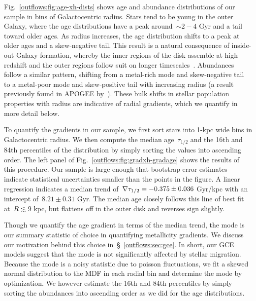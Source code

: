Fig.~\ref{outflows:fig:age-xh-dists} shows age and abundance distributions of
our sample in bins of Galactocentric radius.
Stars tend to be young in the outer Galaxy, where the age distributions have a
peak around~$\sim$$2-4$ Gyr and a tail toward older ages.
As radius increases, the age distribution shifts to a peak at older ages and a
skew-negative tail.
This result is a natural consequence of inside-out Galaxy formation, whereby
the inner regions of the disk assemble at high redshift and the outer regions
follow suit on longer timescales~\citep[e.g.,][]{White1991, Bird2013}.
Abundances follow a similar pattern, shifting from a metal-rich mode and
skew-negative tail to a metal-poor mode and skew-positive tail with increasing
radius (a result previously found in APOGEE by~\citealt{Hayden2015}).
These bulk shifts in stellar population properties with radius are indicative
of radial gradients, which we quantify in more detail below.
\par
To quantify the gradients in our sample, we first sort stars into 1-kpc wide
bins in Galactocentric radius.
We then compute the median age~$\tau_{1/2}$ and the 16th and 84th percentiles
of the distribution by simply sorting the values into ascending order.
The left panel of Fig.~\ref{outflows:fig:gradxh-gradage} shows the results of
this procedure.
Our sample is large enough that bootstrap error estimates indicate statistical
uncertainties smaller than the points in the figure.
A linear regression indicates a median trend of~$\nabla\tau_{1/2} = -0.375 \pm 0.036$
Gyr/kpc with an intercept of~$8.21 \pm 0.31$ Gyr.
The median age closely follows this line of best fit at~$R \lesssim 9$ kpc, but
flattens off in the outer disk and reverses sign slightly.
\par
Though we quantify the age gradient in terms of the median trend, the mode is
our summary statistic of choice in quantifying metallicity gradients.
We discuss our motivation behind this choice in~\S~\ref{outflows:sec:gce}.
In short, our GCE models suggest that the mode is not significantly affected
by stellar migration.
Because the mode is a noisy statistic due to poisson fluctuations, we fit a
skewed normal distribution to the MDF in each radial bin and determine the mode
by optimization.
We however estimate the 16th and 84th percentiles by simply sorting the
abundances into ascending order as we did for the age distributions.

